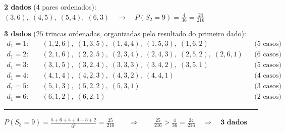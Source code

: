 \documentclass[10pt,a4paper]{article}
\begin{document}
\begin{exambox}[title={Resolução combinatória por contagem direta (conforme folha de prova)}]
\textbf{2 dados} ($4$ pares ordenados): \quad
$(3,6),\; (4,5),\; (5,4),\; (6,3) \quad \longrightarrow \quad \displaystyle P(S_2 = 9) = \frac{4}{36} = \frac{24}{216}$

\vspace{0.3em}
\textbf{3 dados} ($25$ trincas ordenadas, organizadas pelo resultado do primeiro dado):
\vspace{-0.4em}
\begin{align*}
d_1 = 1: &\quad (1,2,6),\; (1,3,5),\; (1,4,4),\; (1,5,3),\; (1,6,2) && \text{($5$ casos)}\\
d_1 = 2: &\quad (2,1,6),\; (2,2,5),\; (2,3,4),\; (2,4,3),\; (2,5,2),\; (2,6,1) && \text{($6$ casos)}\\
d_1 = 3: &\quad (3,1,5),\; (3,2,4),\; (3,3,3),\; (3,4,2),\; (3,5,1) && \text{($5$ casos)}\\
d_1 = 4: &\quad (4,1,4),\; (4,2,3),\; (4,3,2),\; (4,4,1) && \text{($4$ casos)}\\
d_1 = 5: &\quad (5,1,3),\; (5,2,2),\; (5,3,1) && \text{($3$ casos)}\\
d_1 = 6: &\quad (6,1,2),\; (6,2,1) && \text{($2$ casos)}
\end{align*}
\vspace{-0.7em}
\hrule
\vspace{0.35em}
\centering
$\displaystyle P(S_3 = 9) = \frac{5 + 6 + 5 + 4 + 3 + 2}{6^3} = \frac{25}{216}
\qquad \Longrightarrow \qquad
\frac{25}{216} > \frac{4}{36} = \frac{24}{216} \quad \Longrightarrow \quad \boxed{\textbf{3 dados}}$
\end{exambox}

\vspace{0.25em}
\end{document}
